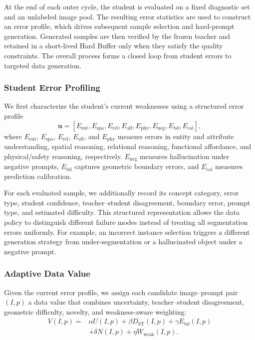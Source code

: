 At the end of each outer cycle, the student is evaluated on a fixed
diagnostic set and an unlabeled image pool. The resulting error statistics
are used to construct an error profile, which drives subsequent sample
selection and hard-prompt generation. Generated samples are then verified
by the frozen teacher and retained in a short-lived Hard Buffer only when
they satisfy the quality constraints. The overall process forms a closed
loop from student errors to targeted data generation.

\subsubsection{Student Error Profiling}
\label{subsec:error_profile}

We first characterize the student's current weaknesses using a structured
error profile
\begin{equation}
\mathbf{u}
=
[
E_{\mathrm{ent}},
E_{\mathrm{spa}},
E_{\mathrm{rel}},
E_{\mathrm{aff}},
E_{\mathrm{phy}},
E_{\mathrm{neg}},
E_{\mathrm{bd}},
E_{\mathrm{cal}}
],
\label{eq:error_profile}
\end{equation}
where $E_{\mathrm{ent}}$, $E_{\mathrm{spa}}$, $E_{\mathrm{rel}}$,
$E_{\mathrm{aff}}$, and $E_{\mathrm{phy}}$ measure errors in entity and
attribute understanding, spatial reasoning, relational reasoning,
functional affordance, and physical/safety reasoning, respectively.
$E_{\mathrm{neg}}$ measures hallucination under negative prompts,
$E_{\mathrm{bd}}$ captures geometric boundary errors, and
$E_{\mathrm{cal}}$ measures prediction calibration.

For each evaluated sample, we additionally record its concept category,
error type, student confidence, teacher--student disagreement, boundary
error, prompt type, and estimated difficulty. This structured representation
allows the data policy to distinguish different failure modes instead of
treating all segmentation errors uniformly. For example, an incorrect
instance selection triggers a different generation strategy from
under-segmentation or a hallucinated object under a negative prompt.

\subsubsection{Adaptive Data Value}
\label{subsec:data_value}

Given the current error profile, we assign each candidate image--prompt
pair $(I,p)$ a data value that combines uncertainty, teacher--student
disagreement, geometric difficulty, novelty, and weakness-aware weighting:
\begin{equation}
\begin{aligned}
V(I,p)
={}&
\alpha U(I,p)
+\beta D_{\mathrm{ST}}(I,p)
+\gamma E_{\mathrm{bd}}(I,p) \\
&+\delta N(I,p)
+\eta W_{\mathrm{weak}}(I,p).
\end{aligned}
\label{eq:data_value}
\end{equation}


